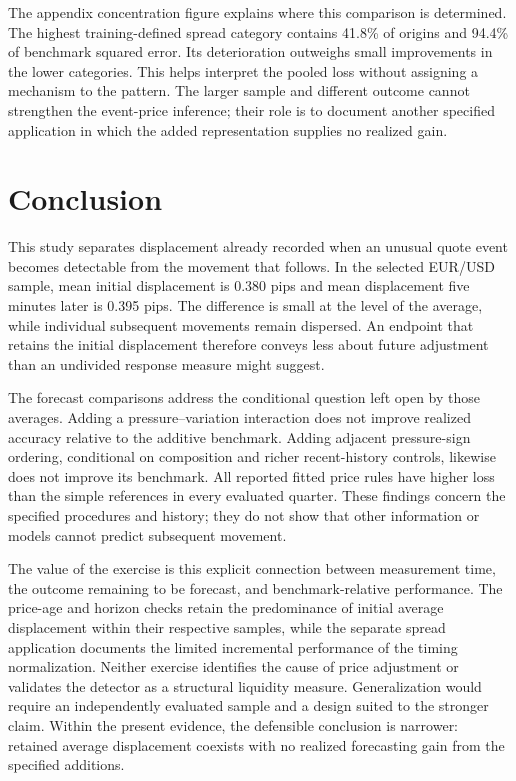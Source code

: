 \documentclass[12pt,letterpaper]{article}
\begin{document}
The appendix concentration figure explains where this comparison is determined. The highest training-defined spread category contains 41.8\% of origins and 94.4\% of benchmark squared error. Its deterioration outweighs small improvements in the lower categories. This helps interpret the pooled loss without assigning a mechanism to the pattern. The larger sample and different outcome cannot strengthen the event-price inference; their role is to document another specified application in which the added representation supplies no realized gain.

\FloatBarrier
\section{Conclusion}\label{sec:conclusion}
This study separates displacement already recorded when an unusual quote event becomes detectable from the movement that follows. In the selected EUR/USD sample, mean initial displacement is 0.380 pips and mean displacement five minutes later is 0.395 pips. The difference is small at the level of the average, while individual subsequent movements remain dispersed. An endpoint that retains the initial displacement therefore conveys less about future adjustment than an undivided response measure might suggest.

The forecast comparisons address the conditional question left open by those averages. Adding a pressure--variation interaction does not improve realized accuracy relative to the additive benchmark. Adding adjacent pressure-sign ordering, conditional on composition and richer recent-history controls, likewise does not improve its benchmark. All reported fitted price rules have higher loss than the simple references in every evaluated quarter. These findings concern the specified procedures and history; they do not show that other information or models cannot predict subsequent movement.

The value of the exercise is this explicit connection between measurement time, the outcome remaining to be forecast, and benchmark-relative performance. The price-age and horizon checks retain the predominance of initial average displacement within their respective samples, while the separate spread application documents the limited incremental performance of the timing normalization. Neither exercise identifies the cause of price adjustment or validates the detector as a structural liquidity measure. Generalization would require an independently evaluated sample and a design suited to the stronger claim. Within the present evidence, the defensible conclusion is narrower: retained average displacement coexists with no realized forecasting gain from the specified additions.
\end{document}

